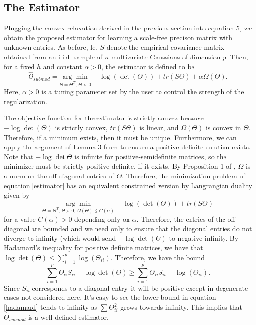 \documentclass{uwstat572}
\theoremstyle{remark}
\theoremstyle{definition}
\begin{document}
\subsection{The Estimator}

Plugging the convex relaxation derived in the previous section into equation 5, we obtain the proposed estimator for learning a scale-free precison matrix with unknown entries.  As before, let $S$ denote the empirical covariance matrix obtained from an i.i.d. sample of $n$ multivariate Gaussians of dimension $p$.  Then, for a fixed $h$ and constant $\alpha > 0$, the estimator is defined to be
\begin{equation}\label{estimator}
\widehat{\Theta}_{submod} = \underset{\Theta = \Theta^T, \, \Theta \succ 0}{\arg \min} - \log(\det(\Theta)) + tr(S \Theta) + \alpha \Omega(\Theta).
\end{equation}
Here, $\alpha > 0$ is a tuning parameter set by the user to control the strength of the regularization.  

The objective function for the estimator is strictly convex because $- \log \det(\Theta)$ is strictly convex, $tr(S \Theta)$ is linear, and $\Omega(\Theta)$ is convex in $\Theta$.  Therefore, if a minimum exists, then it must be unique.  Furthermore, we can apply the argument of Lemma 3 from \cite{ravikumar2011} to ensure a positive definite solution exists.  Note that $- \log \det \Theta$ is infinite for positive-semidefinite matrices, so the minimizer must be strictly positive definite, if it exists.  By Proposition 1 of \cite{bach2010}, $\Omega$ is a norm on the off-diagonal entries of $\Theta$.  Therefore, the minimization problem of equation \eqref{estimator} has an equivalent constrained version by Langrangian duality given by
\begin{equation}
\underset{\Theta = \Theta^T, \, \Theta \succ 0, \, \Omega(\Theta) \leq C(\alpha)}{\arg \min} - \log(\det(\Theta)) + tr(S \Theta)
\end{equation}
for a value $C(\alpha) > 0$ depending only on $\alpha$. Therefore, the entries of the off-diagonal are bounded and we need only to ensure that the diagonal entries do not diverge to infinity (which would send $- \log \det (\Theta)$ to negative infinity.  By Hadamard's inequality for positive definite matrices, we have that $\log \det (\Theta) \leq \sum_{i=1}^p \log (\Theta_{ii})$.  Therefore, we have the bound
\begin{equation}\label{hadamard}
\sum_{i=1}^p \Theta_{ii} S_{ii} - \log \det (\Theta) \geq \sum_{i=1}^p\Theta_{ii} S_{ii} - \log (\Theta_{ii}).
\end{equation}
Since $S_{ii}$ corresponds to a diagonal entry, it will be positive except in degenerate cases not considered here.  It's easy to see the lower bound in equation \eqref{hadamard} tends to infinity as $\sum \Theta_{ii}^2$ grows towards infinity.  This implies that $\widehat{\Theta}_{submod}$ is a well defined estimator.
\end{document}
